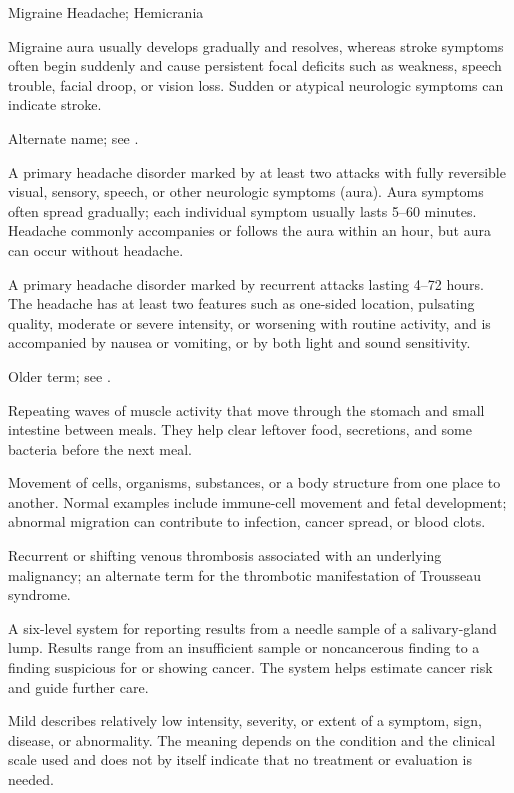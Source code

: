 \synonyms
Migraine Headache; Hemicrania

 Migraine aura usually develops gradually and resolves, whereas stroke symptoms often begin suddenly and cause persistent focal deficits such as weakness, speech trouble, facial droop, or vision loss. Sudden or atypical neurologic symptoms can indicate stroke.

 Alternate name; see .

 A primary headache disorder marked by at least two attacks with fully reversible visual, sensory, speech, or other neurologic symptoms (aura). Aura symptoms often spread gradually; each individual symptom usually lasts 5--60 minutes. Headache commonly accompanies or follows the aura within an hour, but aura can occur without headache.

 A primary headache disorder marked by recurrent attacks lasting 4--72 hours. The headache has at least two features such as one-sided location, pulsating quality, moderate or severe intensity, or worsening with routine activity, and is accompanied by nausea or vomiting, or by both light and sound sensitivity.

 Older term; see .

 Repeating waves of muscle activity that move through the stomach and small intestine between meals. They help clear leftover food, secretions, and some bacteria before the next meal.

 Movement of cells, organisms, substances, or a body structure from one place to another. Normal examples include immune-cell movement and fetal development; abnormal migration can contribute to infection, cancer spread, or blood clots.

 Recurrent or shifting venous thrombosis associated with an underlying malignancy; an alternate term for the thrombotic manifestation of Trousseau syndrome.

 A six-level system for reporting results from a needle sample of a salivary-gland lump. Results range from an insufficient sample or noncancerous finding to a finding suspicious for or showing cancer. The system helps estimate cancer risk and guide further care.

 Mild describes relatively low intensity, severity, or extent of a symptom, sign, disease, or abnormality. The meaning depends on the condition and the clinical scale used and does not by itself indicate that no treatment or evaluation is needed.

